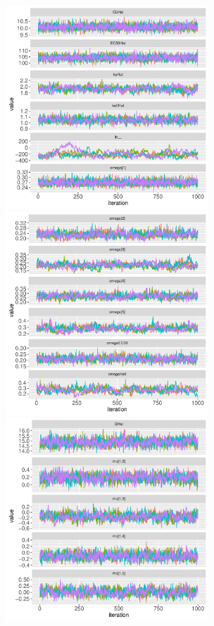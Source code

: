 \documentclass[11pt]{amsart}
\begin{document}
\begin{figure}[htbp]
\includegraphics[width=3.0in,trim=0in 0in 0 0in]{graphics/effCptModelTorsten/effCptModelTorstenPlots001.pdf}
\includegraphics[width=3.0in,trim=0in 0in 0 0in]{graphics/effCptModelTorsten/effCptModelTorstenPlots002.pdf}
\includegraphics[width=3.0in,trim=0in 0in 0 0in]{graphics/effCptModelTorsten/effCptModelTorstenPlots003.pdf}

\end{figure}
\end{document}
